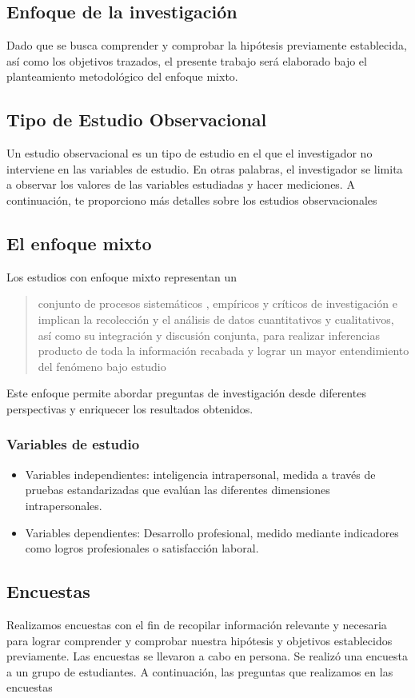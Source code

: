 \subsection{Enfoque de la investigación}
Dado que se busca comprender y comprobar la hipótesis previamente establecida,
así como los objetivos trazados, el presente trabajo será elaborado bajo el
planteamiento metodológico del enfoque mixto.
\subsection{Tipo de Estudio Observacional}
Un estudio observacional es un tipo de estudio en el que el investigador no interviene en las
variables de estudio. En otras palabras, el investigador se limita a observar los valores de
las variables estudiadas y hacer mediciones. A continuación, te proporciono más detalles
sobre los estudios observacionales
\subsection{El enfoque mixto}
Los estudios con enfoque mixto representan un 
\begin{quote}
conjunto de procesos sistemáticos , empíricos y críticos de investigación e
implican la recolección y el análisis de datos cuantitativos y cualitativos, así
como su integración y discusión conjunta, para realizar inferencias producto de
toda la información recabada y lograr un mayor entendimiento del fenómeno bajo
estudio \parencite{unitec}
\end{quote}
Este enfoque permite abordar preguntas de investigación desde diferentes
perspectivas y enriquecer los resultados obtenidos.
\subsubsection{Variables de estudio}
\begin{itemize}
\item Variables independientes: inteligencia intrapersonal, medida a través de pruebas estandarizadas que evalúan las diferentes dimensiones intrapersonales.
\item Variables dependientes: Desarrollo profesional, medido mediante indicadores como logros profesionales o satisfacción laboral.
\end{itemize}
\subsection{Encuestas}
Realizamos encuestas con el fin de recopilar información relevante y necesaria para lograr
comprender y comprobar nuestra hipótesis y objetivos establecidos previamente. Las
encuestas se llevaron a cabo en persona. Se realiz\'o una encuesta a un grupo de estudiantes. A continuación, las preguntas que realizamos en las encuestas

